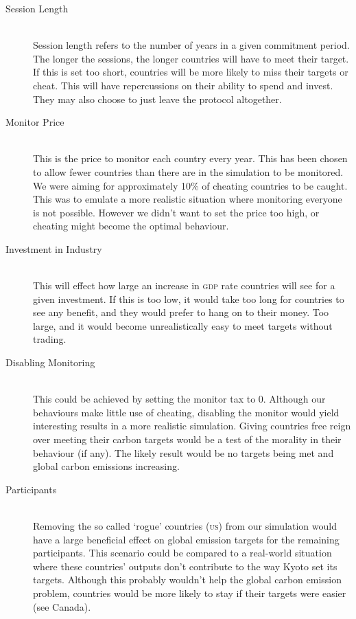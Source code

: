 \begin{description}
\item[Session Length] \hfill \\

Session length refers to the number of years in a given commitment period. The longer the sessions, the longer countries will have to meet their target. If this is set too short, countries will be more likely to miss their targets or cheat. This will have repercussions on their ability to spend and invest. They may also choose to just leave the protocol altogether.

\item[Monitor Price] \hfill \\

This is the price to monitor each country every year. This has been chosen to allow fewer countries than there are in the simulation to be monitored. We were aiming for approximately 10\% of cheating countries to be caught. This was to emulate a more realistic situation where monitoring everyone is not possible. However we didn't want to set the price too high, or cheating might become the optimal behaviour.

\item[Investment in Industry] \hfill \\

This will effect how large an increase in \textsc{gdp} rate countries will see for a given investment. If this is too low, it would take too long for countries to see any benefit, and they would prefer to hang on to their money. Too large, and it would become unrealistically easy to meet targets without trading.

\item[Disabling Monitoring] \hfill \\

This could be achieved by setting the monitor tax to 0. Although our behaviours make little use of cheating, disabling the monitor would yield interesting results in a more realistic simulation. Giving countries free reign over meeting their carbon targets would be a test of the morality in their behaviour (if any). The likely result would be no targets being met and global carbon emissions increasing.

\item[Participants] \hfill \\

Removing the so called `rogue' countries (\textsc{us}) from our simulation would have a large beneficial effect on global emission  targets for the remaining participants. This scenario could be compared to a real-world situation where these countries' outputs don't contribute to the way Kyoto set its targets. Although this probably wouldn't help the global carbon emission problem, countries would be more likely to stay if their targets were easier (see Canada).


\end{description}
